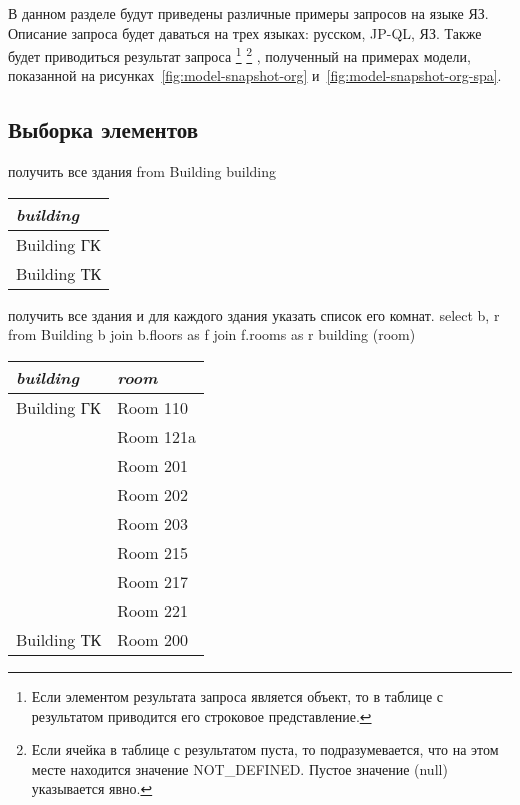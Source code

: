 
В данном разделе будут приведены различные примеры запросов на языке ЯЗ.
Описание запроса будет даваться на трех языках: русском, JP-QL, ЯЗ. Также
будет приводиться результат запроса
    \footnote{Если элементом результата запроса является объект, то в таблице с результатом
	приводится его строковое представление.}
    \footnote{Если ячейка в таблице с результатом пуста, то подразумевается, что
	на этом месте находится значение NOT\_DEFINED. Пустое значение (null) указывается явно.}
, полученный на примерах модели, показанной  на рисунках~\ref{fig:model-snapshot-org} и~\ref{fig:model-snapshot-org-spa}.







\subsection{Выборка элементов}
\exastable
    {получить все здания}
    {from Building}
    {building}
    {\begin{tabular}{|l|}
	\hline
	\it{building}\\[5pt]
	\hline
	\hline
	Building ГК\\
	\hline
	Building ТК\\
	\hline
    \end{tabular}}


\exastable
    {получить все здания и для каждого здания указать список его комнат.}
    {select b, r from Building b join b.floors as f join f.rooms as r}
    {building (room)}
    {\begin{tabular}{|l|l|}
	\hline
	\it{building} & \it{room} \\[5pt]
	\hline
	\hline
	Building ГК & Room 110\\
	\cline{2-2}
		    & Room 121a\\
	\cline{2-2}
		    & Room 201\\
	\cline{2-2}
		    & Room 202\\
	\cline{2-2}
		    & Room 203\\
	\cline{2-2}
		    & Room 215\\
	\cline{2-2}
		    & Room 217\\
	\cline{2-2}
		    & Room 221\\
	\hline
	Building ТК & Room 200\\	
	\hline
    \end{tabular}}

